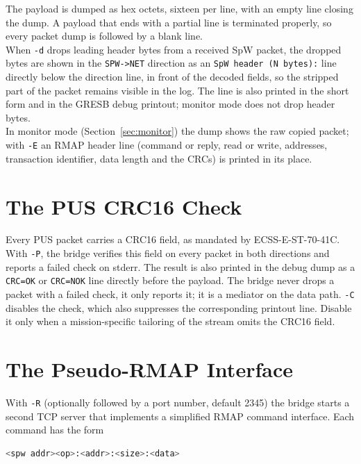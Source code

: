 \noindent
The payload is dumped as hex octets, sixteen per line, with an empty line
closing the dump. A payload that ends with a partial line is terminated
properly, so every packet dump is followed by a blank line.
\\
When \texttt{-d} drops leading header bytes from a received \gls{SpW} packet,
the dropped bytes are shown in the \texttt{SPW->NET} direction as an
\texttt{SpW header (N bytes):} line directly below the direction line, in front of
the decoded fields, so the stripped part of the packet remains visible in the
log. The line is also printed in the short form and in the GRESB debug
printout; monitor mode does not drop header bytes.
\\
In monitor mode (Section~\ref{sec:monitor}) the dump shows the raw copied
packet; with \texttt{-E} an \gls{RMAP} header line (command or reply, read or
write, addresses, transaction identifier, data length and the CRCs) is printed
in its place.

\section{The PUS CRC16 Check}
\label{sec:puscrc}

Every \gls{PUS} packet carries a CRC16 field, as mandated by
\gls{ECSS}-E-ST-70-41C. With \texttt{-P}, the bridge verifies this field on
every packet in both directions and reports a failed check on
{\ttfamily stderr}. The result is also printed in the debug dump as a
\texttt{CRC=OK} or \texttt{CRC=NOK} line directly before the payload. The
bridge never drops a packet with a failed check, it only reports it; it is a
mediator on the data path. \texttt{-C} disables the check, which also
suppresses the corresponding printout line. Disable it only when a
mission-specific tailoring of the stream omits the CRC16 field.

\section{The Pseudo-RMAP Interface}
\label{sec:rmapif}

With \texttt{-R} (optionally followed by a port number, default 2345) the
bridge starts a second TCP server that implements a simplified \gls{RMAP}
command interface. Each command has the form

\begin{lstlisting}[language=bash]
  <spw addr><op>:<addr>:<size>:<data>
\end{lstlisting}

